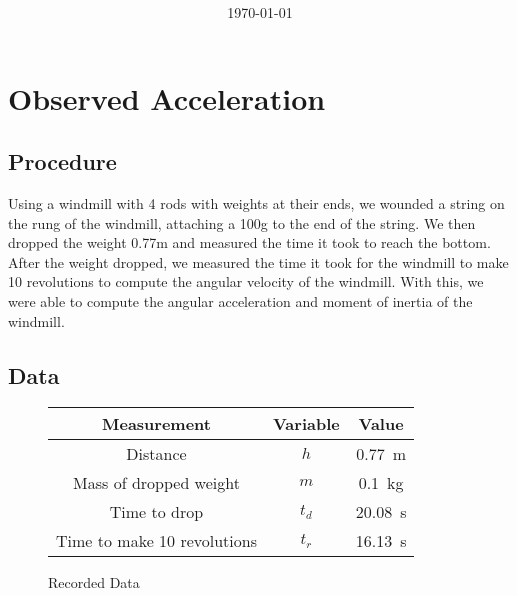 \documentclass[article, 11pt]{article}
\title{
    \vspace{2in}
    \textmd{\textbf{\labTitle}}
    \normalsize\vspace{0.1in}\\
    \vspace{0.1in}\large{\text{\class: \professor}}
    \vspace{3in}
}
\author{\name}
\date{\today}
\begin{document}
    \maketitle
    \thispagestyle{empty}
    \pagebreak
    
    \section{Observed Acceleration}
    \subsection{Procedure}
    \noindent 
    Using a windmill with 4 rods with weights at their ends, we wounded a string on the rung of the windmill, attaching a 100g to the end of the string. We then dropped the weight 0.77m and measured the time it took to reach the bottom. After the weight dropped, we measured the time it took for the windmill to make 10 revolutions to compute the angular velocity of the windmill. With this, we were able to compute the angular acceleration and moment of inertia of the windmill.

    \subsection{Data}
    \begin{figure}[H]
        \begin{center}
            \begin{tabular}{|c|c|c|}
                \hline
                \textbf{Measurement} & \textbf{Variable} & \textbf{Value} \\
                \hline
                Distance & $h$ & \SI{0.77}{\meter} \\
                Mass of dropped weight & $m$ & \SI{0.1}{\kilogram} \\
                Time to drop & $t_d$ & \SI{20.08}{\second} \\
                Time to make 10 revolutions & $t_r$ & \SI{16.13}{\second} \\
                \hline
            \end{tabular}
        \end{center}
        \caption{Recorded Data}
    \end{figure}
\end{document}
